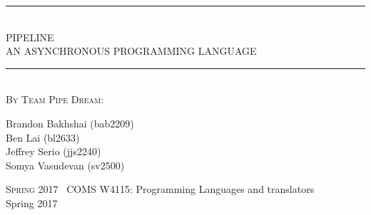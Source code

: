 \documentclass[./LRM_main.tex]{subfiles}
\begin{document}
  \begin{titlepage}
    \textheight
    \centering
    \vspace*{\baselineskip}
    \rule{\textwidth}{3pt}\\[\baselineskip]
    {\Huge PIPELINE \\[0.3\baselineskip] AN ASYNCHRONOUS PROGRAMMING LANGUAGE}\\[0.2\baselineskip]
    \rule{\textwidth}{3pt}\\[\baselineskip]
    \scshape
    \vspace*{2\baselineskip}
    By Team Pipe Dream: \\ %
    {\Large Brandon Bakhshai (bab2209) \\ Ben Lai (bl2633) \\ 
    Jeffrey Serio (jjs2240) \\ Somya Vasudevan (sv2500) \par}
    \vfill
    {\scshape Spring 2017} \ {\large COMS W4115: Programming Languages and translators
                                     \\ Spring 2017}\par
  \end{titlepage}
  
\end{document}

